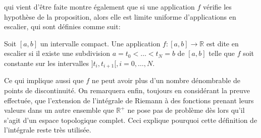 qui vient d'être faite montre également que si une application $f$ vérifie les
hypothèse de la proposition, alors elle est limite uniforme d'applications en
escalier, qui sont définies comme suit:
\begin{defn}
Soit $[a,b]$ un intervalle compact. Une application $f \colon [a,b] \to
\mathbb{R}$ est dite en escalier si il existe une subdivision $a=t_0 < \dots <
t_N =b$ de $[a,b]$ telle que $f$ soit constante sur les intervalles
$]t_i,t_{i+1}[, i=0,\dots,N$.
\end{defn}
Ce qui implique aussi que $f$ ne peut avoir plus d'un nombre dénombrable de
points de discontinuité. 
On remarquera enfin, toujours en considérant la preuve effectuée, que
l'extension de l'intégrale de Riemann à des fonctions prenant leurs valeurs dans
un autre ensemble que $\mathbb{R}^+$ ne pose pas de problème dès lors qu'il
s'agit d'un espace topologique complet. Ceci explique pourquoi cette définition
de l'intégrale reste très utilisée. 

